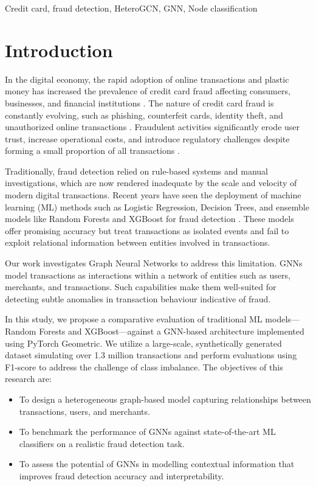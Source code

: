 \documentclass[conference]{IEEEtran}
\begin{document}
\begin{IEEEkeywords}
Credit card, fraud detection, HeteroGCN, GNN, Node classification
\end{IEEEkeywords}

\section{Introduction}

In the digital economy, the rapid adoption of online transactions and plastic money has increased the prevalence of credit card fraud affecting consumers, businesses, and financial institutions \cite{chaudhary2012review}. The nature of credit card fraud is constantly evolving, such as phishing, counterfeit cards, identity theft, and unauthorized online transactions \cite{xuan2018random}. Fraudulent activities significantly erode user trust, increase operational costs, and introduce regulatory challenges despite forming a small proportion of all transactions \cite{sailusha2020ml}. 

Traditionally, fraud detection relied on rule-based systems and manual investigations, which are now rendered inadequate by the scale and velocity of modern digital transactions. Recent years have seen the deployment of machine learning (ML) methods such as Logistic Regression, Decision Trees, and ensemble models like Random Forests and XGBoost for fraud detection \cite{awoyemi2017comparative, xuan2018random}. These models offer promising accuracy but treat transactions as isolated events and fail to exploit relational information between entities involved in transactions.

Our work investigates Graph Neural Networks to address this limitation. GNNs model transactions as interactions within a network of entities such as users, merchants, and transactions. Such capabilities make them well-suited for detecting subtle anomalies in transaction behaviour indicative of fraud.

In this study, we propose a comparative evaluation of traditional ML models—Random Forests and XGBoost—against a GNN-based architecture implemented using PyTorch Geometric. We utilize a large-scale, synthetically \cite{data_generation} generated dataset \cite{dataset1} simulating over 1.3 million transactions and perform evaluations using F1-score to address the challenge of class imbalance. The objectives of this research are:

\begin{itemize}
    \item To design a heterogeneous graph-based model capturing relationships between transactions, users, and merchants.
    \item To benchmark the performance of GNNs against state-of-the-art ML classifiers on a realistic fraud detection task.
    \item To assess the potential of GNNs in modelling contextual information that improves fraud detection accuracy and interpretability.
\end{itemize}
\end{document}
